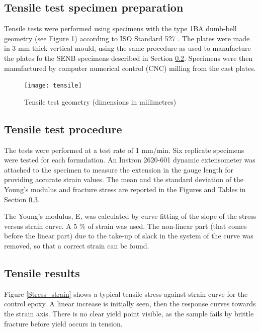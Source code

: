 \documentclass[numbers=noendperiod,chapterprefix=on]{icldt} %
\begin{document}
\subsection{Tensile test specimen preparation}

Tensile tests were performed using specimens with the type 1BA dumb-bell geometry (see Figure \ref{tensile}) according to ISO Standard 527 \cite{Blackman2003c}. The plates were made in 3 mm thick vertical mould, using the same procedure as used to manufacture the plates fo the SENB specimens described in Section \ref{Tensile_test_procedure}. Specimens were then manufactured by computer numerical control (CNC) milling from the cast plates.  

\begin{figure}[!htpb]
\centering
\texttt{[image: tensile]}
\caption{Tensile test geometry (dimensions in millimetres) \cite{Chong2015}} \label{tensile}
\end{figure}


\subsection{Tensile test procedure} \label{Tensile_test_procedure}

The tests were performed at a test rate of 1 mm/min. Six replicate specimens were tested for each formulation. An Instron 2620-601 dynamic extensometer was attached to the specimen to measure the extension in the gauge length for providing accurate strain values. 
The mean and the standard deviation of the Young's modulus and fracture stress are reported in the Figures and Tables in Section \ref{Tensile_results}.

The Young's modulus, E, was calculated by curve fitting of the slope of the stress versus strain curve.
A 5 \% of strain was used.
The non-linear part (that comes before the linear part)
due to the take-up of slack in the system of the curve was removed, so that a correct strain can be found. 

\subsection{Tensile results} \label{Tensile_results}
Figure \ref{Stress_strain} shows a typical tensile stress against strain curve for the control epoxy. A linear increase 
is initially seen, then the response curves towards the strain axis. There is no clear yield point visible, as the sample fails by brittle fracture before yield occurs in tension.
\end{document}
